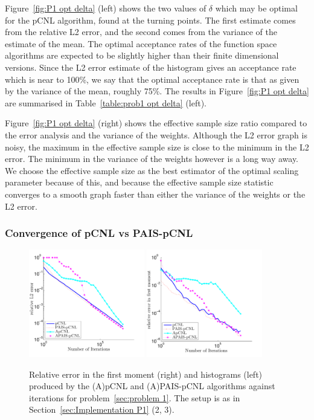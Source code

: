 \documentclass[final]{siamltex}
\begin{document}
Figure~\ref{fig:P1 opt delta} (left) shows the two values of $\delta$ which may be optimal for the pCNL algorithm, found at the turning points. The first estimate comes from the relative L2 error, and the second comes from the variance of the estimate of the mean. The optimal acceptance rates of the function space algorithms are expected to be slightly higher than their finite dimensional versions. Since the L2 error estimate of the histogram gives an acceptance rate which is near to 100\%, we say that the optimal acceptance rate is that as given by the variance of the mean, roughly 75\%. The results in Figure~\ref{fig:P1 opt delta} are summarised in Table~\ref{table:prob1 opt delta} (left).

Figure~\ref{fig:P1 opt delta} (right) shows the effective sample size ratio compared to the error analysis and the variance of the weights. Although the L2 error graph is noisy, the maximum in the effective sample size is close to the minimum in the L2 error. The minimum in the variance of the weights however is a long way away. We choose the effective sample size as the best estimator of the optimal scaling parameter because of this, and because the effective sample size statistic converges to a smooth graph faster than either the variance of the weights or the L2 error.

\subsubsection{Convergence of pCNL vs PAIS-pCNL}

\begin{figure}[htb]
\centering
\includegraphics[width=0.45\textwidth]{"figures/pCNL1l"}
\includegraphics[width=0.45\textwidth]{"figures/pCNL1m"}
\caption{Relative error in the first moment (right) and histograms (left) produced by the (A)pCNL and (A)PAIS-pCNL algorithms against iterations for problem~\ref{sec:problem 1}. The setup is as in Section~\ref{sec:Implementation P1} (2, 3).}
\label{fig:MH1 L2}
\end{figure}
\end{document}
